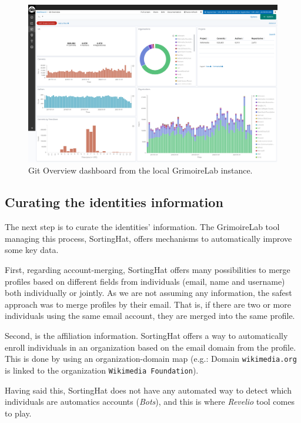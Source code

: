 \documentclass[a4paper, 12pt]{book}
\begin{document}
\begin{figure}
 \centering
  \includegraphics[width=15cm, keepaspectratio]{img/local-instance-grimoirelab-1.png}
  \caption{Git Overview dashboard from the local GrimoireLab instance.}
  \label{fig:local-grimoirelab-git}
\end{figure}

\subsection{Curating the identities information}
\label{ssec:curate-identities}

The next step is to curate the identities' information. The GrimoireLab tool managing this process, SortingHat, offers mechanisms to automatically improve some key data.

First, regarding account-merging, SortingHat offers many possibilities to merge profiles based on different fields from individuals (email, name and username) both individually or jointly. As we are not assuming any information, the safest approach was to merge profiles by their email. That is, if there are two or more individuals using the same email account, they are merged into the same profile.

Second, is the affiliation information. SortingHat offers a way to automatically enroll individuals in an organization based on the email domain from the profile. This is done by using an organization-domain map (e.g.: Domain \texttt{wikimedia.org} is linked to the organization \texttt{Wikimedia Foundation}).

Having said this, SortingHat does not have any automated way to detect which individuals are automatics accounts (\emph{Bots}), and this is where \emph{Revelio} tool comes to play.
\end{document}
